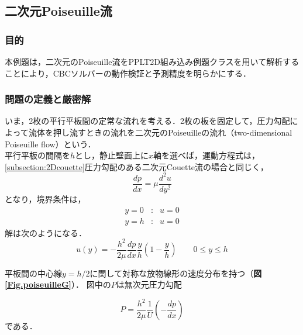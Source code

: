 
\graphicspath{{./fig_2Dpoiseuille/}}

\subsection{二次元Poiseuille流}

%
\subsubsection{目的}
本例題は，二次元のPoiseuille流をPPLT2D組み込み例題クラスを用いて解析することにより，CBCソルバーの動作検証と予測精度を明らかにする．

%
\subsubsection{問題の定義と厳密解}
いま，2枚の平行平板間の定常な流れを考える．2枚の板を固定して，圧力勾配によって流体を押し流すときの流れを二次元のPoiseuilleの流れ（two-dimensional Poiseuille flow）という\cite{imai:73}．\\

平行平板の間隔を$h$とし，静止壁面上に$x$軸を選べば，運動方程式は，\ref{subsection:2Dcouette}圧力勾配のある二次元Couette流の場合と同じく，
\begin{equation}
\frac{dp}{dx}=\mu\frac{d^2u}{dy^2}
\end{equation}
となり，境界条件は，
\begin{equation}
\begin{array}{lll}
y=0 & : & u=0 \\
y=h & : & u=0
\end{array}
\end{equation}
解は次のようになる．
\begin{equation}
u(y)=-\frac{h^2}{2\mu}\frac{dp}{dx}\frac{y}{h}
\left(1-\frac{y}{h}\right)
\mbox{　　}0\leq y\leq h
\end{equation}

平板間の中心線$y=h/2$に関して対称な放物線形の速度分布を持つ（\textbf{図\ref{Fig.poiseuilleG}}）．
図中の$P$は無次元圧力勾配

\begin{equation}
P = \frac{h^2}{2\mu}\frac{1}{U}\left(-\frac{dp}{dx}\right)
\end{equation}
である．

